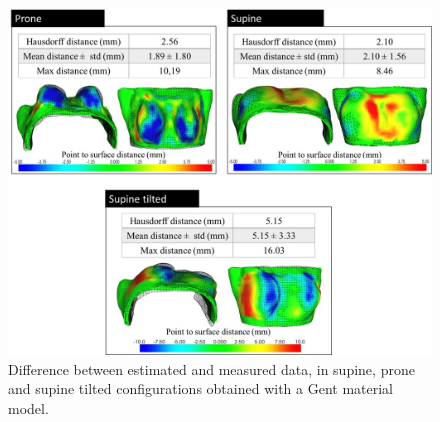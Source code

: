 \begin{figure}[!h]
\centering
\includegraphics[width=\textwidth,keepaspectratio]{figures/modelevaluation_gent.jpg} 
\caption{Difference between estimated and measured data, in supine, prone and supine tilted configurations obtained with a Gent material model. }\label{fig:modelevaluation_gent}
\end{figure}